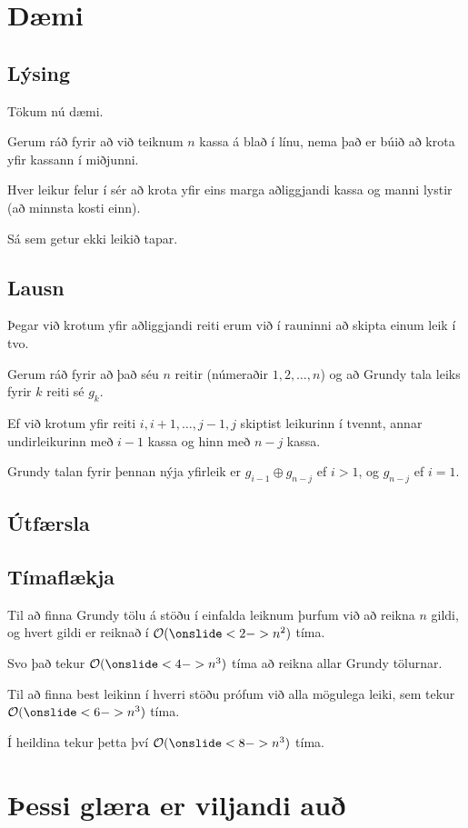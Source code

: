 \section{Dæmi}
\subsection{Lýsing}
{
    {
        \item<1-> Tökum nú dæmi.
        \item<2-> Gerum ráð fyrir að við teiknum $n$ kassa á blað í línu, nema það er búið að krota yfir kassann í miðjunni.
        \item<3-> Hver leikur felur í sér að krota yfir eins marga aðliggjandi kassa og manni lystir (að minnsta kosti einn).
        \item<4-> Sá sem getur ekki leikið tapar.
    }
}

\subsection{Lausn}
{
    {
        \item<1-> Þegar við krotum yfir aðliggjandi reiti erum við í rauninni að skipta einum leik í tvo.
        \item<2-> Gerum ráð fyrir að það séu $n$ reitir (númeraðir $1, 2, \dots, n$) og að Grundy tala leiks fyrir $k$ reiti sé $g_k$.
        \item<3-> Ef við krotum yfir reiti $i, i + 1, \dots, j - 1, j$ skiptist leikurinn í tvennt,
                    annar undirleikurinn með $i - 1$ kassa og hinn með $n - j$ kassa.
        \item<4-> Grundy talan fyrir þennan nýja yfirleik er $g_{i - 1} \oplus g_{n - j}$ ef $i > 1$,
                    og $g_{n - j}$ ef $i = 1$.
    }
}

\subsection{Útfærsla}
{
}

{
}

\subsection{Tímaflækja}
{
    {
        \item<1-> Til að finna Grundy tölu á stöðu í einfalda leiknum þurfum við að reikna $n$ gildi,
                    og hvert gildi er reiknað í $\mathcal{O}(\onslide<2->{n^2})$ tíma.
        \item<3-> Svo það tekur $\mathcal{O}(\onslide<4->{n^3})$ tíma að reikna allar Grundy tölurnar.
        \item<5-> Til að finna best leikinn í hverri stöðu prófum við alla mögulega leiki, sem tekur $\mathcal{O}(\onslide<6->{n^3})$ tíma.
        \item<7-> Í heildina tekur þetta því $\mathcal{O}(\onslide<8->{n^3})$ tíma.
    }
}

\section{Þessi glæra er viljandi auð}
{
}


